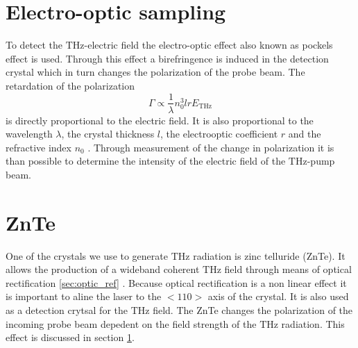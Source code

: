 
\section{Electro-optic sampling}\label{sec:eos}
To detect the $\si{\tera\hertz}$-electric field the electro-optic effect also known as pockels effect is used.
Through this effect a birefringence is induced in the detection crystal which in turn changes the polarization of the probe beam.
The retardation of the polarization 
\begin{equation}
    \Gamma \propto \frac{1}{\lambda} n_0^3 l r E_\text{THz}
\end{equation}
is directly proportional to the electric field. 
It is also proportional to the wavelength $\lambda$, the crystal thickness $l$, the electrooptic coefficient $r$ and the refractive index $n_0$ \cite{wiki_book}.  
Through measurement of the change in polarization it is than possible to determine the intensity of the electric field of the $\si{\tera\hertz}$-pump beam.


\section{ZnTe}
One of the crystals we use to generate $\si{\tera\hertz}$ radiation is zinc telluride (ZnTe). 
It allows the production of a wideband coherent $\si{\tera\hertz}$ field through means of optical rectification \ref{sec:optic_ref} \cite{ZnTe_Nahata_Weling_1996}.
Because optical rectification is a non linear effect it is important to aline the laser to the $<110>$ axis of the crystal.
It is also used as a detection crytsal for the $\si{\tera\hertz}$ field.
The ZnTe changes the polarization of the incoming probe beam depedent on the field strength of the $\si{\tera\hertz}$ radiation.
This effect is discussed in section \ref{sec:eos}.

